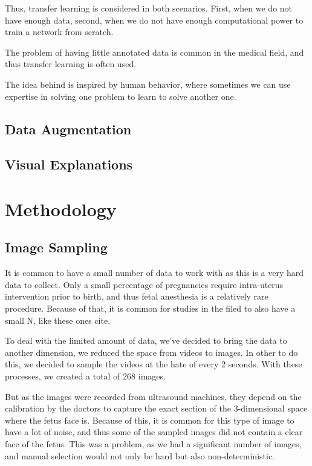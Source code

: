 Thus, transfer learning is considered in both scenarios. First, when we do not have enough data, second, when we do not have enough computational power to train a network from scratch.

The problem of having little annotated data is common in the medical field, and thus transfer learning is often used.

The idea behind is inspired by human behavior, where sometimes we can use expertise in solving one problem to learn to solve another one.

\subsection{Data Augmentation}

\subsection{Visual Explanations}

\section{Methodology}

\subsection{Image Sampling}

It is common to have a small number of data to work with as this is a very hard data to collect. Only a small percentage of pregnancies require intra-uterus intervention prior to birth, and thus fetal anesthesia is a relatively rare procedure. Because of that, it is common for studies in the filed to also have a small N, like these ones cite{}.

To deal with the limited amount of data, we've decided to bring the data to another dimension, we reduced the space from videos to images. In other to do this, we decided to sample the videos at the hate of every 2 seconds. With these processes, we created a total of 268 images.

But as the images were recorded from ultrasound machines, they depend on the calibration by the doctors to capture the exact section of the 3-dimensional space where the fetus face is. Because of this, it is common for this type of image to have a lot of noise, and thus some of the sampled images did not contain a clear face of the fetus. This was a problem, as we had a significant number of images, and manual selection would not only be hard but also non-deterministic.

